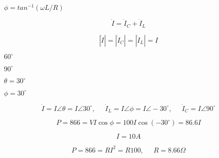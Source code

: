 {\newpage\clearpage
{}%
$\phi=tan^{-1}(\omega L/R)$%
\lthtmlinlinemathZ
\lthtmlcheckvsize\clearpage}

{\newpage\clearpage
{}%
\begin{displaymath} \dot{I}=\dot{I}_C+\dot{I}_L \end{displaymath}%
\lthtmldisplayZ
\lthtmlcheckvsize\clearpage}

{\newpage\clearpage
{}%
\begin{displaymath} |\dot{I}|=|\dot{I}_C|=|\dot{I}_L|=I \end{displaymath}%
\lthtmldisplayZ
\lthtmlcheckvsize\clearpage}

{\newpage\clearpage
{}%
$60^\circ$%
\lthtmlinlinemathZ
\lthtmlcheckvsize\clearpage}

{\newpage\clearpage
{}%
$90^\circ$%
\lthtmlinlinemathZ
\lthtmlcheckvsize\clearpage}

{\newpage\clearpage
{}%
$\theta=30^\circ$%
\lthtmlinlinemathZ
\lthtmlcheckvsize\clearpage}

{\newpage\clearpage
{}%
$\phi=30^\circ$%
\lthtmlinlinemathZ
\lthtmlcheckvsize\clearpage}

{\newpage\clearpage
{}%
\begin{displaymath} \dot{I}=I\angle \theta=I\angle 30^\circ,\;\;\;\;\;\dot{I}_L=I\angle \phi=I\angle -30^\circ,
\;\;\;\;\;\dot{I}_C=I\angle 90^\circ  \end{displaymath}%
\lthtmldisplayZ
\lthtmlcheckvsize\clearpage}

{\newpage\clearpage
{}%
\begin{displaymath} P=866=V I \cos\phi =100 I \cos (-30^\circ)=86.6 I \end{displaymath}%
\lthtmldisplayZ
\lthtmlcheckvsize\clearpage}

{\newpage\clearpage
{}%
\begin{displaymath} I=10 A \end{displaymath}%
\lthtmldisplayZ
\lthtmlcheckvsize\clearpage}

{\newpage\clearpage
{}%
\begin{displaymath} P=866=RI^2=R 100,\;\;\;\;\;R=8.66 \Omega \end{displaymath}%
\lthtmldisplayZ
\lthtmlcheckvsize\clearpage}

